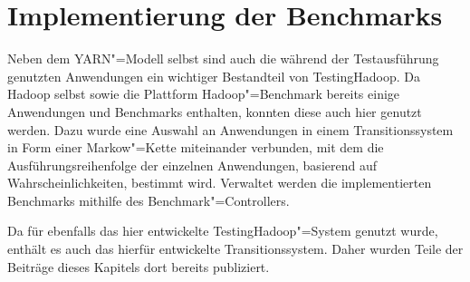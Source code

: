 \chapter{Implementierung der Benchmarks}
\label{ch:benchmarks}

Neben dem YARN"=Modell selbst sind auch die während der Testausführung genutzten Anwendungen ein wichtiger Bestandteil von TestingHadoop.
Da Hadoop selbst sowie die Plattform Hadoop"=Benchmark bereits einige Anwendungen und Benchmarks enthalten, konnten diese auch hier genutzt werden.
Dazu wurde eine Auswahl an Anwendungen in einem Transitionssystem in Form einer Markow"=Kette miteinander verbunden, mit dem die Ausführungsreihenfolge der einzelnen Anwendungen, basierend auf Wahrscheinlichkeiten, bestimmt wird.
Verwaltet werden die implementierten Benchmarks mithilfe des Benchmark"=Controllers.

Da für \cite{Eberhardinger2018} ebenfalls das hier entwickelte TestingHadoop"=System genutzt wurde, enthält es auch das hierfür entwickelte Transitionssystem.
Daher wurden Teile der Beiträge dieses Kapitels dort bereits publiziert.





